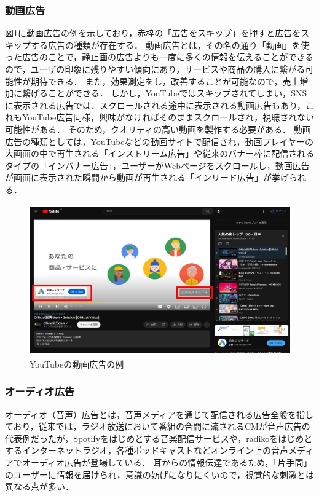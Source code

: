 \documentclass[12pt,a4j,titlepage]{ltjsarticle}
\begin{document}
\subsubsection{動画広告}
図\ref{fig:動画広告}に動画広告の例を示しており，赤枠の「広告をスキップ」を押すと広告をスキップする広告の種類が存在する．
動画広告とは，その名の通り「動画」を使った広告のことで，静止画の広告よりも一度に多くの情報を伝えることができるので，ユーザの印象に残りやすい傾向にあり，サービスや商品の購入に繋がる可能性が期待できる\cite{movie}．
また，効果測定をし，改善することが可能なので，売上増加に繋げることができる．
しかし，YouTubeではスキップされてしまい，SNSに表示される広告では、スクロールされる途中に表示される動画広告もあり，これもYouTube広告同様，興味がなければそのままスクロールされ，視聴されない可能性がある．
そのため，クオリティの高い動画を製作する必要がある．
動画広告の種類としては，YouTubeなどの動画サイトで配信され，動画プレイヤーの大画面の中で再生される「インストリーム広告」や従来のバナー枠に配信されるタイプの「インバナー広告」，ユーザーがWebページをスクロールし，動画広告が画面に表示された瞬間から動画が再生される「インリード広告」が挙げられる．

\begin{figure}[H]
\begin{center}
 \includegraphics[height=65mm]{figures/動画広告.pdf}
\end{center}
 \caption{YouTubeの動画広告の例}
 \label{fig:動画広告}
\end{figure}

\subsubsection{オーディオ広告}
\label{subsubsec:ad}
オーディオ（音声）広告とは，音声メディアを通じて配信される広告全般を指しており，従来では，ラジオ放送において番組の合間に流されるCMが音声広告の代表例だったが，Spotifyをはじめとする音楽配信サービスや，radikoをはじめとするインターネットラジオ，各種ポッドキャストなどオンライン上の音声メディアでオーディオ広告が登場している\cite{audio}．
耳からの情報伝達であるため，「片手間」のユーザーに情報を届けられ，意識の妨げになりにくいので，視覚的な刺激とは異なる点が多い．
\end{document}
